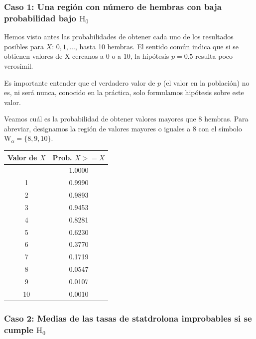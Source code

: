 \documentclass[
]{article}
\begin{document}
\subsubsection{\texorpdfstring{Caso 1: Una región con número de hembras con baja probabilidad bajo \(\mathrm{H}_{0}\)}{Caso 1: Una región con número de hembras con baja probabilidad bajo \textbackslash mathrm\{H\}\_\{0\}}}\label{caso-1-una-regiuxf3n-con-nuxfamero-de-hembras-con-baja-probabilidad-bajo-mathrmh_0}

Hemos visto antes las probabilidades de obtener cada uno de los resultados posibles para \(X\): \(0,1, \ldots\), hasta 10 hembras. El sentido común indica que si se obtienen valores de X cercanos a 0 o a 10, la hipótesis \(p=0.5\) resulta poco verosímil.

Es importante entender que el verdadero valor de \(p\) (el valor en la población) no es, ni será nunca, conocido en la práctica, solo formulamos hipótesis sobre este valor.

Veamos cuál es la probabilidad de obtener valores mayores que 8 hembras. Para abreviar, designamos la región de valores mayores o iguales a 8 con el símbolo \(\mathrm{W}_{\alpha}=\{8,9,10\}\).

\begin{longtable}[]{@{}cc@{}}
\toprule\noalign{}
Valor de \(X\) & Prob. \(X>=X\) \\
\midrule\noalign{}
\endhead
\bottomrule\noalign{}
\endlastfoot
0 & 1.0000 \\
1 & 0.9990 \\
2 & 0.9893 \\
3 & 0.9453 \\
4 & 0.8281 \\
5 & 0.6230 \\
6 & 0.3770 \\
7 & 0.1719 \\
8 & 0.0547 \\
9 & 0.0107 \\
10 & 0.0010 \\
\end{longtable}

\subsubsection{\texorpdfstring{Caso 2: Medias de las tasas de statdrolona improbables si se cumple \(\mathrm{H}_{0}\)}{Caso 2: Medias de las tasas de statdrolona improbables si se cumple \textbackslash mathrm\{H\}\_\{0\}}}\label{caso-2-medias-de-las-tasas-de-statdrolona-improbables-si-se-cumple-mathrmh_0}
\end{document}
